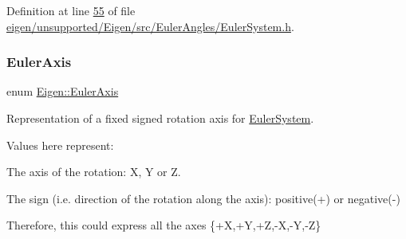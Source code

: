 Definition at line \hyperlink{eigen_2unsupported_2_eigen_2src_2_euler_angles_2_euler_system_8h_source_l00055}{55} of file \hyperlink{eigen_2unsupported_2_eigen_2src_2_euler_angles_2_euler_system_8h_source}{eigen/unsupported/\+Eigen/src/\+Euler\+Angles/\+Euler\+System.\+h}.

\mbox{\label{namespace_eigen_ae614aa7cdd687fb5c421a54f2ce5c361}} 
\subsubsection{\texorpdfstring{Euler\+Axis}{EulerAxis}\hspace{0.1cm}{\footnotesize\ttfamily [2/2]}}
{\footnotesize\ttfamily enum \hyperlink{namespace_eigen_ae614aa7cdd687fb5c421a54f2ce5c361}{Eigen\+::\+Euler\+Axis}}



Representation of a fixed signed rotation axis for \hyperlink{class_eigen_1_1_euler_system}{Euler\+System}. 

Values here represent\+:
\begin{DoxyItemize}
\item The axis of the rotation\+: X, Y or Z.
\item The sign (i.\+e. direction of the rotation along the axis)\+: positive(+) or negative(-\/)
\end{DoxyItemize}

Therefore, this could express all the axes \{+X,+Y,+Z,-\/X,-\/Y,-\/Z\}

